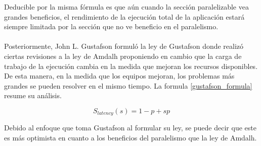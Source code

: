 Deducible por la misma fórmula es que aún cuando la sección paralelizable vea grandes beneficios, el rendimiento de la ejecución total de la aplicación estará siempre limitada por la sección que no ve beneficio en el paralelismo.
\\
\\
Posteriormente, John L. Gustafson formuló la ley de Gustafson \cite{Gustafson:1988:RAL:42411.42415} donde realizó ciertas revisiones a la ley de Amdalh proponiendo en cambio que la carga de trabajo de la ejecución cambia en la medida que mejoran los recursos disponibles. De esta manera, en la medida que los equipos mejoran, los problemas más grandes se pueden resolver en el mismo tiempo. La formula \ref{gustafson_formula} resume su análisis.

\begin{equation}
\label{gustafson_formula}
    S_{latency}\left ( s \right ) = 1 - p + sp
\end{equation}

Debido al enfoque que toma Gustafson al formular su ley, se puede decir que este es más optimista en cuanto a los beneficios del paralelismo que la ley de Amdalh.





